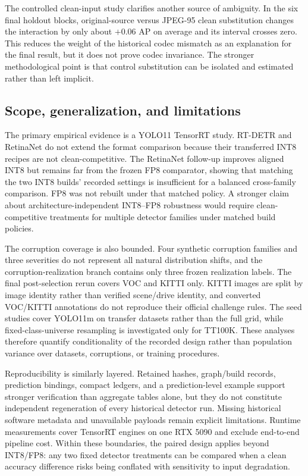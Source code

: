 \documentclass[a4paper,fleqn]{cas-dc}
\begin{document}
The controlled clean-input study clarifies another source of ambiguity. In the six final holdout blocks, original-source versus JPEG-95 clean substitution changes the interaction by only about $+0.06$ AP on average and its interval crosses zero. This reduces the weight of the historical codec mismatch as an explanation for the final result, but it does not prove codec invariance. The stronger methodological point is that control substitution can be isolated and estimated rather than left implicit.

\subsection{Scope, generalization, and limitations}

The primary empirical evidence is a YOLO11 TensorRT study. RT-DETR and RetinaNet do not extend the format comparison because their transferred INT8 recipes are not clean-competitive. The RetinaNet follow-up improves aligned INT8 but remains far from the frozen FP8 comparator, showing that matching the two INT8 builds' recorded settings is insufficient for a balanced cross-family comparison. FP8 was not rebuilt under that matched policy. A stronger claim about architecture-independent INT8--FP8 robustness would require clean-competitive treatments for multiple detector families under matched build policies.

The corruption coverage is also bounded. Four synthetic corruption families and three severities do not represent all natural distribution shifts, and the corruption-realization branch contains only three frozen realization labels. The final post-selection rerun covers VOC and KITTI only. KITTI images are split by image identity rather than verified scene/drive identity, and converted VOC/KITTI annotations do not reproduce their official challenge rules. The seed studies cover YOLO11m on transfer datasets rather than the full grid, while fixed-class-universe resampling is investigated only for TT100K. These analyses therefore quantify conditionality of the recorded design rather than population variance over datasets, corruptions, or training procedures.

Reproducibility is similarly layered. Retained hashes, graph/build records, prediction bindings, compact ledgers, and a prediction-level example support stronger verification than aggregate tables alone, but they do not constitute independent regeneration of every historical detector run. Missing historical software metadata and unavailable payloads remain explicit limitations. Runtime measurements cover TensorRT engines on one RTX 5090 and exclude end-to-end pipeline cost. Within these boundaries, the paired design applies beyond INT8/FP8: any two fixed detector treatments can be compared when a clean accuracy difference risks being conflated with sensitivity to input degradation.
\end{document}
